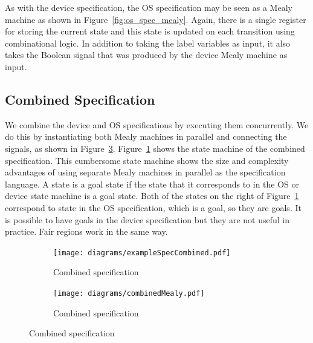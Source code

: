 As with the device specification, the OS specification may be seen as a Mealy machine as shown in Figure~\ref{fig:os_spec_mealy}. Again, there is a single register for storing the current state and this state is updated on each transition using combinational logic. In addition to taking the label variables as input, it also takes the  Boolean signal that was produced by the device Mealy machine as input. 

\subsection{Combined Specification}

We combine the device and OS specifications by executing them concurrently. We do this by instantiating both Mealy machines in parallel and connecting the signals, as shown in Figure~\ref{fig:combined_spec_mealy}. Figure~\ref{fig:combined_spec} shows the state machine of the combined specification. This cumbersome state machine shows the size and complexity advantages of using separate Mealy machines in parallel as the specification language. A state is a goal state if the state that it corresponds to in the OS or device state machine is a goal state. Both of the states on the right of Figure~\ref{fig:combined_spec} correspond to state  in the OS specification, which is a goal, so they are goals. It is possible to have goals in the device specification but they are not useful in practice. Fair regions work in the same way.

\begin{figure}
\centering
\begin{subfigure}[t]{0.47\textwidth}
\texttt{[image: diagrams/exampleSpecCombined.pdf]}
\caption{Combined specification}
\label{fig:combined_spec}
\end{subfigure}
\hfill
\begin{subfigure}[t]{0.47\textwidth}
\texttt{[image: diagrams/combinedMealy.pdf]}
\caption{Combined specification}
\label{fig:combined_spec_mealy}
\end{subfigure}
\end{figure}

